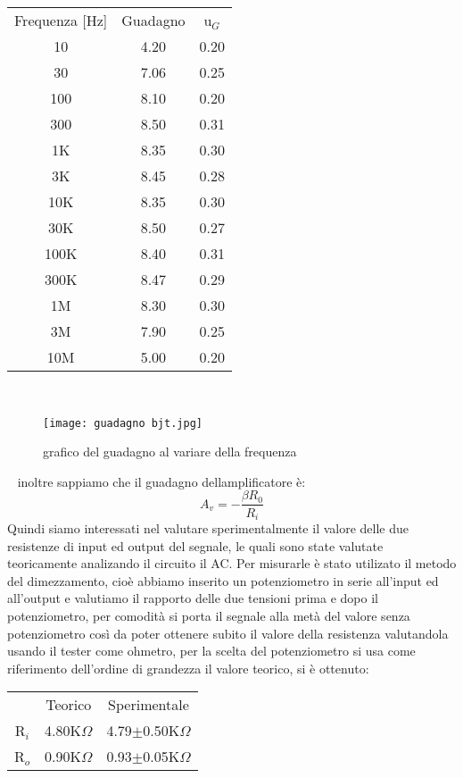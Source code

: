 \documentclass{article}
\begin{document}
\begin{table}[]
    \begin{center}
        \begin{tabular}{|c|c|c|}
        Frequenza [Hz]&Guadagno&u$_{G}$\\
      10&4.20&0.20\\
      30&7.06&0.25\\
      100&8.10&0.20\\
      300&8.50&0.31\\
      1K&8.35&0.30\\
      3K&8.45&0.28\\
      10K&8.35&0.30\\
      30K&8.50&0.27\\
      100K&8.40&0.31\\
      300K&8.47&0.29\\
      1M&8.30&0.30\\
      3M&7.90&0.25\\
      10M&5.00&0.20
      \end{tabular}
   \end{center}
\end{table} 
~
\begin{figure}[h!]
    \centering
    \texttt{[image: guadagno bjt.jpg]}
    \caption{grafico del guadagno al variare della frequenza}
    \label{figura1}
\end{figure}
~
inoltre sappiamo che il guadagno dellamplificatore è:
\begin{equation}
    A_{v}=-\frac{\beta R_{0}}{R_{i}}
\end{equation}
Quindi siamo interessati nel valutare sperimentalmente il valore delle due resistenze di input ed output del segnale, le quali sono state valutate teoricamente analizando il circuito il AC. Per misurarle è stato utilizato il metodo del dimezzamento, cioè abbiamo inserito un potenziometro in serie all'input ed all'output e valutiamo il rapporto delle due tensioni prima e dopo il potenziometro, per comodità si porta il segnale alla metà del valore senza potenziometro così da poter ottenere subito il valore della resistenza valutandola usando il tester come ohmetro, per la scelta del potenziometro si usa come riferimento dell'ordine di grandezza il valore teorico, si è ottenuto:
\begin{table}[]
    \begin{center}
        \begin{tabular}{c|c|c}
         &Teorico&Sperimentale\\
      R$_{i}$&4.80K$\Omega$&4.79$\pm$0.50K$\Omega$\\
      R$_{o}$&0.90K$\Omega$&0.93$\pm$0.05K$\Omega$\\
         \end{tabular}
   \end{center}
\end{table} 
~
\end{document}
